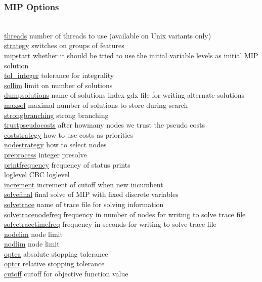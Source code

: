 \subsubsection{MIP Options}
\begin{tabbing}
\hspace {1.3in} \= \\
\hyperlink{threads}
{threads} \> number of threads to use (available on Unix variants only) \\
\hyperlink{strategy}
{strategy} \> switches on groups of features \\
\hyperlink{mipstart}
{mipstart} \> whether it should be tried to use the initial variable levels as initial MIP solution \\
\hyperlink{tol_integer}
{tol\_integer} \> tolerance for integrality \\
\hyperlink{sollim}
{sollim} \> limit on number of solutions \\
\hyperlink{dumpsolutions}
{dumpsolutions} \> name of solutions index gdx file for writing alternate solutions \\
\hyperlink{maxsol}
{maxsol} \> maximal number of solutions to store during search \\
\hyperlink{strongbranching}
{strongbranching} \> strong branching \\
\hyperlink{trustpseudocosts}
{trustpseudocosts} \> after howmany nodes we trust the pseudo costs \\
\hyperlink{coststrategy}
{coststrategy} \> how to use costs as priorities \\
\hyperlink{nodestrategy}
{nodestrategy} \> how to select nodes \\
\hyperlink{preprocess}
{preprocess} \> integer presolve \\
\hyperlink{printfrequency}
{printfrequency} \> frequency of status prints \\
\hyperlink{loglevel}
{loglevel} \> CBC loglevel \\
\hyperlink{increment}
{increment} \> increment of cutoff when new incumbent \\
\hyperlink{solvefinal}
{solvefinal} \> final solve of MIP with fixed discrete variables \\
\hyperlink{solvetrace}
{solvetrace} \> name of trace file for solving information \\
\hyperlink{solvetracenodefreq}
{solvetracenodefreq} \> frequency in number of nodes for writing to solve trace file \\
\hyperlink{solvetracetimefreq}
{solvetracetimefreq} \> frequency in seconds for writing to solve trace file \\
\hyperlink{nodelim}
{nodelim} \> node limit \\
\hyperlink{nodlim}
{nodlim} \> node limit \\
\hyperlink{optca}
{optca} \> absolute stopping tolerance \\
\hyperlink{optcr}
{optcr} \> relative stopping tolerance \\
\hyperlink{cutoff}
{cutoff} \> cutoff for objective function value
\end{tabbing}


